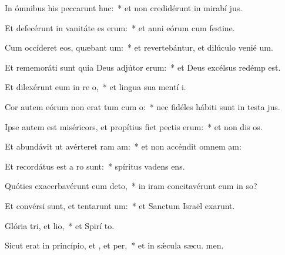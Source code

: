 \item In ómnibus his peccarunt huc:~* et non credidérunt in mirabí jus.
\item Et defecérunt in vanitáte es erum:~* et anni eórum cum festine.
\item Cum occíderet eos, quæbant um:~* et revertebántur, et dilúculo venié  um.
\item Et rememoráti sunt quia Deus adjútor  erum:~* et Deus excélsus redémp  est.
\item Et dilexérunt eum in re o,~* et lingua sua mentí  i.
\item Cor autem eórum non erat tum cum o:~* nec fidéles hábiti sunt in testa jus.
\item Ipse autem est miséricors, et propítius fiet pectis erum:~* et non dis os.
\item Et abundávit ut avérteret ram am:~* et non accéndit omnem  am:
\item Et recordátus est a ro sunt:~* spíritus vadens   ens.
\item Quóties exacerbavérunt eum  deto,~* in iram concitavérunt eum in so?
\item Et convérsi sunt, et tentarunt um:~* et Sanctum Israël exarunt.
\item Glória tri, et lio,~* et Spirí to.
\item Sicut erat in princípio, et , et per,~* et in sǽcula sæcu. men.
